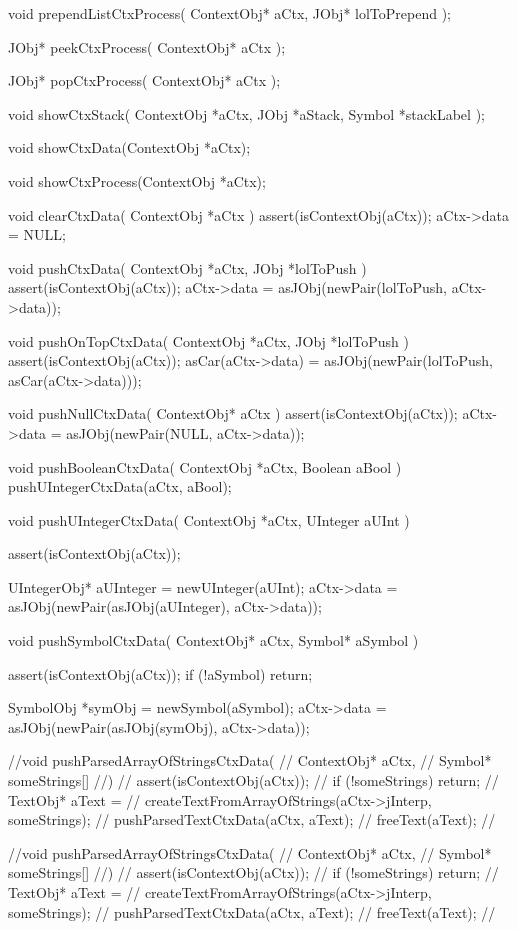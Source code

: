 void prependListCtxProcess(
  ContextObj* aCtx,
  JObj* lolToPrepend
);

JObj* peekCtxProcess(
  ContextObj* aCtx
);

JObj* popCtxProcess(
  ContextObj* aCtx
);

void showCtxStack(
  ContextObj *aCtx,
  JObj *aStack, 
  Symbol *stackLabel
);

void showCtxData(ContextObj *aCtx);

void showCtxProcess(ContextObj *aCtx);
\stopCHeader

\startCCode
void clearCtxData(
  ContextObj *aCtx
) {
  assert(isContextObj(aCtx));
  aCtx->data = NULL;
}

void pushCtxData(
  ContextObj *aCtx,
  JObj       *lolToPush
) {
  assert(isContextObj(aCtx));
  aCtx->data =
    asJObj(newPair(lolToPush, aCtx->data));
}

void pushOnTopCtxData(
  ContextObj *aCtx,
  JObj       *lolToPush
) {
  assert(isContextObj(aCtx));
  asCar(aCtx->data) =
    asJObj(newPair(lolToPush, asCar(aCtx->data)));
}

void pushNullCtxData(
  ContextObj* aCtx
) {
  assert(isContextObj(aCtx));
  aCtx->data = 
    asJObj(newPair(NULL, aCtx->data));
}

void pushBooleanCtxData(
  ContextObj *aCtx,
  Boolean     aBool
) {
  pushUIntegerCtxData(aCtx, aBool);
}

void pushUIntegerCtxData(
  ContextObj *aCtx,
  UInteger    aUInt
) {
  assert(isContextObj(aCtx));

  UIntegerObj* aUInteger = newUInteger(aUInt);
  aCtx->data =
    asJObj(newPair(asJObj(aUInteger), aCtx->data));
}

void pushSymbolCtxData(
  ContextObj* aCtx,
  Symbol* aSymbol
) {
  assert(isContextObj(aCtx));
  if (!aSymbol) return;

  SymbolObj *symObj = newSymbol(aSymbol);
  aCtx->data =
    asJObj(newPair(asJObj(symObj), aCtx->data));
}

//void pushParsedArrayOfStringsCtxData(
//  ContextObj* aCtx,
//  Symbol* someStrings[]
//) {
//  assert(isContextObj(aCtx));
//  if (!someStrings) return;
//  TextObj* aText =
//    createTextFromArrayOfStrings(aCtx->jInterp, someStrings);
//  pushParsedTextCtxData(aCtx, aText);
//  freeText(aText);
//}

//void pushParsedArrayOfStringsCtxData(
//  ContextObj* aCtx,
//  Symbol* someStrings[]
//) {
//  assert(isContextObj(aCtx));
//  if (!someStrings) return;
//  TextObj* aText =
//    createTextFromArrayOfStrings(aCtx->jInterp, someStrings);
//  pushParsedTextCtxData(aCtx, aText);
//  freeText(aText);
//}


